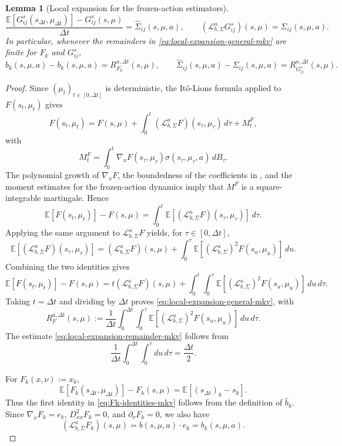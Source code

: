 \documentclass[a4paper, 10pt, english, reqno]{amsart}
\newtheorem{lemma}[theorem]{Lemma}
\begin{document}
\begin{lemma}[Local expansion for the frozen-action estimators]
\begin{equation}
\label{eq:Gij-identities-mkv}
\frac{\mathbb E[G_{ij}^s(s_{\Delta t},\mu_{\Delta t})]-G_{ij}^s(s,\mu)}
{\Delta t}
=
\hat\Sigma_{ij}(s,\mu,a),
\qquad
(\mathscr L_{b,\Sigma}^aG_{ij}^s)(s,\mu)=\Sigma_{ij}(s,\mu,a).
\end{equation}
In particular, whenever the remainders in
\eqref{eq:local-expansion-general-mkv} are finite for $F_k$ and
$G_{ij}^s$,
\[
\hat  b_k(s,\mu,a)-b_k(s,\mu,a)
=
R_{F_k}^{a,\Delta t}(s,\mu), 
\qquad
\hat\Sigma_{ij}(s,\mu,a)-\Sigma_{ij}(s,\mu,a)
=
R_{G_{ij}^s}^{a,\Delta t}(s,\mu).
\]
\end{lemma}\begin{proof}
Since $(\mu_t)_{t\in[0,\Delta t]}$ is deterministic, the
It\^o-Lions formula applied to $F(s_t,\mu_t)$ gives
\[
F(s_t,\mu_t)
=
F(s,\mu)
+
\int_0^t
(\mathscr L_{b,\Sigma}^aF)(s_\tau,\mu_\tau)\,d\tau
+
M_t^F,
\]
with
\[
M_t^F
=
\int_0^t
\nabla_xF(s_\tau,\mu_\tau)
\sigma(s_\tau,\mu_\tau,a)\,dB_\tau .
\]
The polynomial growth of $\nabla_xF$, the boundedness of the coefficients
in , and the moment estimates for the
frozen-action dynamics imply that $M^F$ is a square-integrable
martingale. Hence
\[
\mathbb E[F(s_t,\mu_t)]-F(s,\mu)
=
\int_0^t
\mathbb E[
(\mathscr L_{b,\Sigma}^aF)(s_\tau,\mu_\tau)
]\,d\tau .
\]
Applying the same argument to $\mathscr L_{b,\Sigma}^aF$ yields, for
$\tau\in[0,\Delta t]$,
\[
\mathbb E[
(\mathscr L_{b,\Sigma}^aF)(s_\tau,\mu_\tau)
]
=
(\mathscr L_{b,\Sigma}^aF)(s,\mu)
+
\int_0^\tau
\mathbb E[
(\mathscr L_{b,\Sigma}^a)^2F(s_u,\mu_u)
]\,du .
\]
Combining the two identities gives
\[
\mathbb E[F(s_t,\mu_t)]-F(s,\mu)
=
t(\mathscr L_{b,\Sigma}^aF)(s,\mu)
+
\int_0^t\int_0^\tau
\mathbb E[
(\mathscr L_{b,\Sigma}^a)^2F(s_u,\mu_u)
]\,du\,d\tau .
\]
Taking $t=\Delta t$ and dividing by $\Delta t$ proves
\eqref{eq:local-expansion-general-mkv}, with
\[
R_F^{a,\Delta t}(s,\mu)
:=
\frac1{\Delta t}
\int_0^{\Delta t}\int_0^\tau
\mathbb E[
(\mathscr L_{b,\Sigma}^a)^2F(s_u,\mu_u)
]\,du\,d\tau .
\]
The estimate \eqref{eq:local-expansion-remainder-mkv} follows from
\[
\frac1{\Delta t}\int_0^{\Delta t}\int_0^\tau du\,d\tau
=
\frac{\Delta t}{2}.
\]

For $F_k(x,\nu):=x_k$,
\[
\mathbb E[F_k(s_{\Delta t},\mu_{\Delta t})]-F_k(s,\mu)
=
\mathbb E[(s_{\Delta t})_k-s_k].
\]
Thus the first identity in \eqref{eq:Fk-identities-mkv} follows from
the definition of $\hat b_k$. Since $\nabla_xF_k=e_k$,
$D_{xx}^2F_k=0$, and $\partial_\nu F_k=0$, we also have
\[
(\mathscr L_{b,\Sigma}^aF_k)(s,\mu)
=
b(s,\mu,a)\cdot e_k
=
b_k(s,\mu,a).
\]


\end{proof}
\end{document}
